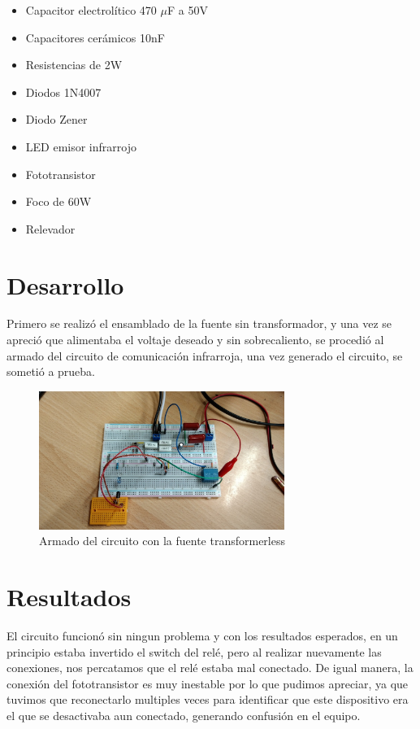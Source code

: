 \documentclass[]{article}
\begin{document}
\begin{itemize}
    \item Capacitor electrolítico 470 $\mu$F a 50V
    \item Capacitores cerámicos 10nF
    \item Resistencias de 2W
    \item Diodos 1N4007
    \item Diodo Zener
    \item LED emisor infrarrojo
    \item Fototransistor
    \item Foco de 60W
    \item Relevador
\end{itemize}

\section{Desarrollo}

Primero se realizó el ensamblado de la fuente sin transformador, y una vez se apreció que alimentaba el voltaje deseado y sin sobrecaliento, se procedió al armado del circuito 
de comunicación infrarroja, una vez generado el circuito, se sometió a prueba.

\begin{figure}[htb]
    \centering
    \includegraphics[width=8cm]{build/Imagenes/Practica4.jpg}
    \caption{Armado del circuito con la fuente transformerless}
\end{figure}

\section{Resultados}

El circuito funcionó sin ningun problema y con los resultados esperados, en un principio estaba invertido el switch del relé, pero al realizar nuevamente las conexiones, nos 
percatamos que el relé estaba mal conectado. De igual manera, la conexión del fototransistor es muy inestable por lo que pudimos apreciar, ya que tuvimos que reconectarlo multiples veces
para identificar que este dispositivo era el que se desactivaba aun conectado, generando confusión en el equipo.
\end{document}
